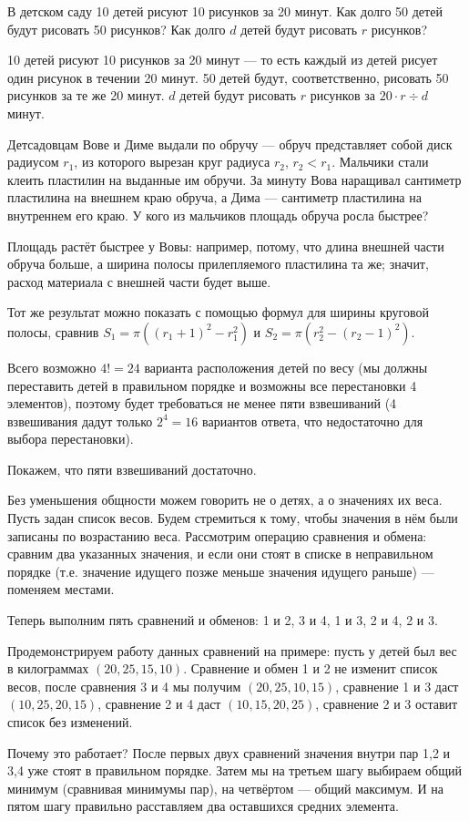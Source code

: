 \begin{itemize}
\itA В детском саду 10 детей рисуют 10 рисунков за 20 минут. Как долго 50 детей будут 
рисовать 50 рисунков? Как долго $d$ детей будут рисовать $r$ рисунков?

10 детей рисуют 10 рисунков за 20 минут --- то есть каждый из детей рисует один рисунок в течении 20 минут.
50 детей будут, соответственно, рисовать 50 рисунков за те же 20 минут.
$d$ детей будут рисовать $r$ рисунков за $20 \cdot r \div d$ минут.

\itB Детсадовцам Вове и Диме выдали по обручу — обруч представляет собой диск 
радиусом $r_1$, из которого вырезан круг радиуса $r_2$, $r_2<r_1$. Мальчики стали клеить 
пластилин на выданные им обручи. За минуту Вова наращивал сантиметр пластилина на внешнем краю 
обруча, а Дима — сантиметр пластилина на внутреннем его краю. У кого из мальчиков площадь обруча росла быстрее?

Площадь растёт быстрее у Вовы: например, потому, что длина внешней части обруча больше,
а ширина полосы прилепляемого пластилина та же; значит, расход материала с внешней части будет выше.

Тот же результат можно показать с помощью формул для ширины круговой полосы, сравнив
$S_1 = \pi((r_1+1)^2 - r_1^2)$ и $S_2 = \pi(r_2^2 - (r_2-1)^2)$.

\itC Всего возможно $4! = 24$ варианта расположения детей по весу (мы должны переставить 
детей в правильном порядке и возможны все перестановки 4 элементов), 
поэтому будет требоваться не менее пяти взвешиваний (4 взвешивания 
дадут только $2^4 = 16$ вариантов ответа, что недостаточно для выбора перестановки).

Покажем, что пяти взвешиваний достаточно. 

Без уменьшения общности можем говорить не о детях, а о значениях их веса.
Пусть задан список весов. Будем стремиться к тому, чтобы значения в нём были записаны по возрастанию веса.
Рассмотрим операцию сравнения и обмена: сравним два указанных значения, и если они стоят в списке
в неправильном порядке (т.е. значение идущего позже меньше значения идущего раньше) --- поменяем местами.

Теперь выполним пять сравнений и обменов: 1 и 2, 3 и 4, 1 и 3, 2 и 4, 2 и 3.

Продемонстрируем работу данных сравнений на примере: пусть у детей был вес в килограммах
$(20,25,15,10)$. Сравнение и обмен 1 и 2 не изменит список весов, после сравнения 3 и 4
мы получим $(20,25,10,15)$, сравнение 1 и 3 даст $(10,25,20,15)$, сравнение 2 и 4 даст
$(10,15,20,25)$, сравнение 2 и 3 оставит список без изменений.

Почему это работает? После первых двух сравнений значения внутри пар 1,2 и 3,4 уже стоят в правильном
порядке. Затем мы на третьем шагу выбираем общий минимум (сравнивая минимумы пар), 
на четвёртом --- общий максимум. И на пятом шагу
правильно расставляем два оставшихся средних элемента.

\end{itemize}
